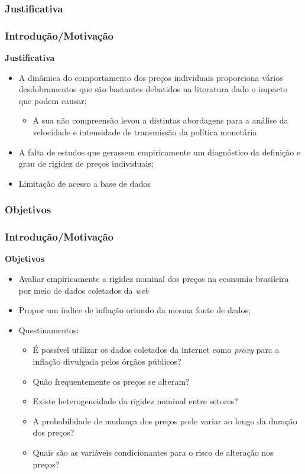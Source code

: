 \documentclass[aspectratio=169]{beamer}
\begin{document}
\subsubsection{Justificativa}

\begin{frame}\frametitle{Introdução/Motivação}
\textbf{Justificativa}
\begin{itemize}
\item A dinâmica do comportamento dos preços individuais proporciona vários desdobramentos que são bastantes debatidos na literatura dado o impacto que podem causar;
  \begin{itemize}
  \item A sua não compreensão levou a distintas abordagens para a análise da velocidade e intensidade de transmissão da política monetária
  \end{itemize}
\item A falta de estudos que gerassem empiricamente um diagnóstico da definição e grau de rigidez de preços individuais;
\item Limitação de acesso a base de dados
\end{itemize}
\end{frame}

\subsubsection{Objetivos}

\begin{frame}\frametitle{Introdução/Motivação}
\textbf{Objetivos}
\begin{itemize}
\item Avaliar empiricamente a rigidez nominal dos preços na economia brasileira por meio de dados coletados da \emph{web}
\item Propor um índice de inflação oriundo da mesma fonte de dados;
\item Questinamentos:
  \begin{itemize}
  \item É possível utilizar os dados coletados da internet como \emph{proxy} para a inflação divulgada pelos órgãos públicos?
  \item Quão frequentemente os preços se alteram?
  \item Existe heterogeneidade da rigidez nominal entre setores?
  \item A probabilidade de mudança dos preços pode variar ao longo da duração dos preços?
  \item Quais são as variáveis condicionantes para o risco de alteração nos preços?
  \end{itemize}
\end{itemize}
\end{frame}
\end{document}
